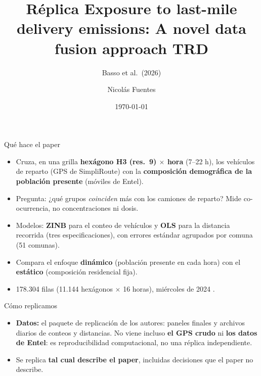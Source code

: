 \documentclass[aspectratio=169,10pt,t]{beamer}
\title{Réplica Exposure to last-mile delivery emissions: A novel data fusion
approach TRD}
\subtitle{Basso et al.\ (2026)}
\author{Nicolás Fuentes}
\date{\today}
\begin{document}
\begin{frame}
  \titlepage
\end{frame}

\begin{frame}{Qué hace el paper}
  \begin{itemize}
    \item Cruza, en una grilla \textbf{hexágono H3 (res.\ 9) $\times$ hora} (7--22 h), los vehículos de reparto (GPS de SimpliRoute) con la \textbf{composición demográfica de la población presente} (móviles de Entel).
    \item Pregunta: ¿qué grupos \emph{coinciden} más con los camiones de reparto? Mide co-ocurrencia, no concentraciones ni dosis.
    \item Modelos: \textbf{ZINB} para el conteo de vehículos y \textbf{OLS} para la distancia recorrida (tres especificaciones), con errores estándar agrupados por comuna (51 comunas).
    \item Compara el enfoque \textbf{dinámico} (población presente en cada hora) con el \textbf{estático} (composición residencial fija).
    \item 178.304 filas (11.144 hexágonos $\times$ 16 horas), miércoles de 2024 \parencite{basso2026}.
  \end{itemize}
\end{frame}

\begin{frame}{Cómo replicamos}
  \begin{itemize}
    \item \textbf{Datos:} el paquete de replicación de los autores: paneles finales y archivos diarios de conteos y distancias. No viene incluso \textbf{el GPS crudo} ni \textbf{los datos de Entel}: es reproducibilidad computacional, no una réplica independiente.
    \item Se replica \textbf{tal cual describe el paper}, incluidas decisiones que el paper no describe.
  \end{itemize}
\end{frame}
\end{document}
